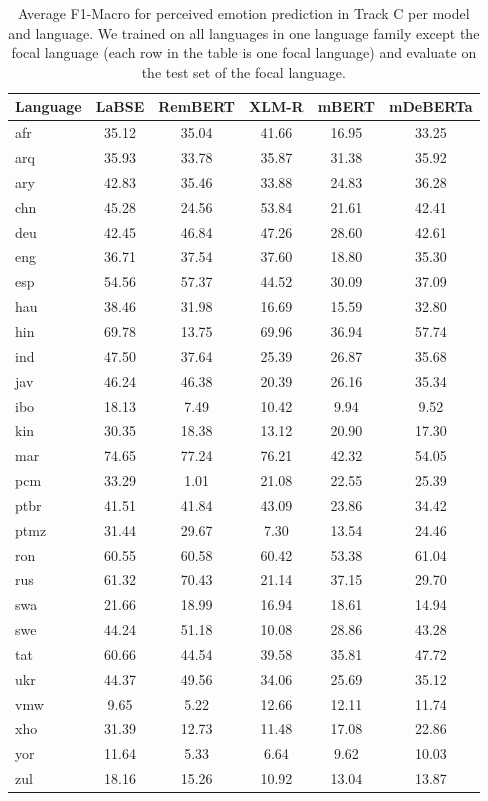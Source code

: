 \begin{table*}
\centering
\begin{tabular}{lccccc}
\toprule
Language & LaBSE & RemBERT & XLM-R & mBERT & mDeBERTa \\
\midrule
afr & 35.12 & 35.04 & 41.66 & 16.95 & 33.25 \\
arq & 35.93 & 33.78 & 35.87 & 31.38 & 35.92 \\
ary & 42.83 & 35.46 & 33.88 & 24.83 & 36.28 \\
chn & 45.28 & 24.56 & 53.84 & 21.61 & 42.41 \\
deu & 42.45 & 46.84 & 47.26 & 28.60 & 42.61 \\
eng & 36.71 & 37.54 & 37.60 & 18.80 & 35.30 \\
esp & 54.56 & 57.37 & 44.52 & 30.09 & 37.09 \\
hau & 38.46 & 31.98 & 16.69 & 15.59 & 32.80 \\
hin & 69.78 & 13.75 & 69.96 & 36.94 & 57.74 \\
ind & 47.50 & 37.64 & 25.39 & 26.87 & 35.68 \\
jav & 46.24 & 46.38 & 20.39 & 26.16 & 35.34 \\
ibo & 18.13 & 7.49 & 10.42 & 9.94 & 9.52 \\
kin & 30.35 & 18.38 & 13.12 & 20.90 & 17.30 \\
mar & 74.65 & 77.24 & 76.21 & 42.32 & 54.05 \\
pcm & 33.29 & 1.01 & 21.08 & 22.55 & 25.39 \\
ptbr & 41.51 & 41.84 & 43.09 & 23.86 & 34.42 \\
ptmz & 31.44 & 29.67 & 7.30 & 13.54 & 24.46 \\
ron & 60.55 & 60.58 & 60.42 & 53.38 & 61.04 \\
rus & 61.32 & 70.43 & 21.14 & 37.15 & 29.70 \\
swa & 21.66 & 18.99 & 16.94 & 18.61 & 14.94 \\
swe & 44.24 & 51.18 & 10.08 & 28.86 & 43.28 \\
tat & 60.66 & 44.54 & 39.58 & 35.81 & 47.72 \\
ukr & 44.37 & 49.56 & 34.06 & 25.69 & 35.12 \\
vmw & 9.65 & 5.22 & 12.66 & 12.11 & 11.74 \\
xho & 31.39 & 12.73 & 11.48 & 17.08 & 22.86 \\
yor & 11.64 & 5.33 & 6.64 & 9.62 & 10.03 \\
zul & 18.16 & 15.26 & 10.92 & 13.04 & 13.87 \\
\bottomrule
\end{tabular}
\caption{Average F1-Macro for perceived emotion prediction in Track C per model and language. We trained on all languages in one language family except the focal language (each row in the table is one focal language) and evaluate on the test set of the focal language.}
\label{tab:main_results_track_c_lms}
\end{table*}